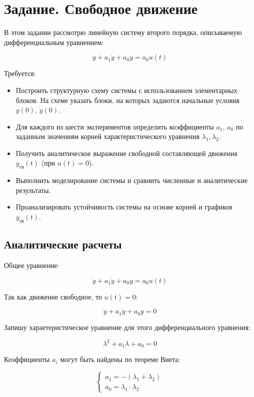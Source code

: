\documentclass[a4paper,12pt]{article}
\begin{document}
	\newpage
	\tableofcontents
	\newpage
	
	\section{Задание. Свободное движение}
	
	В этом задании рассмотрю линейную систему второго порядка, описываемую дифференциальным уравнением:
	
	\[
		\ddot{y} + a_1 \dot{y} + a_0 y = a_0 u(t)
	\]
	
	Требуется:
	
	\begin{itemize}
		\item Построить структурную схему системы с использованием элементарных блоков. На схеме указать блоки, на которых задаются начальные условия \( y(0) \), \( \dot{y}(0) \).
		\item Для каждого из шести экспериментов определить коэффициенты \( a_1 \), \( a_0 \) по заданным значениям корней характеристического уравнения \( \lambda_1, \lambda_2 \).
		\item Получить аналитическое выражение свободной составляющей движения \( y_{\text{св}}(t) \) (при \( u(t) = 0 \)).
		\item Выполнить моделирование системы и сравнить численные и аналитические результаты.
		\item Проанализировать устойчивость системы на основе корней и графиков \( y_{\text{св}}(t) \).
	\end{itemize}
	
	\subsection{Аналитические расчеты}

	Общее уравнение:
	
	\[
	\ddot{y} + a_1 \dot{y} + a_0 y = a_0 u(t)
	\]
	
	Так как движение свободное, то \(u(t) = 0\):
	
	\[
	\ddot{y} + a_1 \dot{y} + a_0 y = 0
	\]
	
	Запишу хараетеристическое уравнение для этого дифференциального уравнения:
	
	\[
	\lambda^2 + a_1 \lambda + a_0 = 0
	\]
	
	Коэффициенты \(a_i\) могут быть найдены по теореме Виета:
	
	\[
		\begin{cases}
			a_1 = - (\lambda_1 + \lambda_2) \\
			a_0 = \lambda_1 \cdot \lambda_2
		\end{cases}
	\]
	
\end{document}
